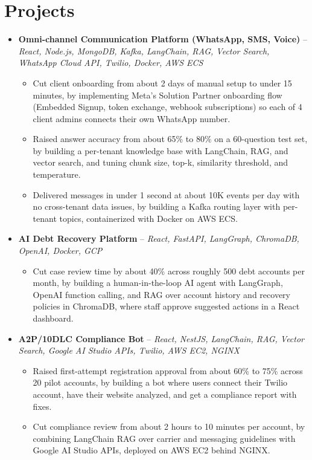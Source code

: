 \documentclass[11pt,a4paper,sans]{moderncv}
\begin{document}
\section{Projects}
\vspace{1pt}
\begin{itemize}

\item \textbf{Omni-channel Communication Platform (WhatsApp, SMS, Voice)} -- \textit{React, Node.js, MongoDB, Kafka, LangChain, RAG, Vector Search, WhatsApp Cloud API, Twilio, Docker, AWS ECS}
\begin{itemize}
    \item Cut client onboarding from about 2 days of manual setup to under 15 minutes, by implementing Meta's Solution Partner onboarding flow (Embedded Signup, token exchange, webhook subscriptions) so each of 4 client admins connects their own WhatsApp number.
    \item Raised answer accuracy from about 65\% to 80\% on a 60-question test set, by building a per-tenant knowledge base with LangChain, RAG, and vector search, and tuning chunk size, top-k, similarity threshold, and temperature.
    \item Delivered messages in under 1 second at about 10K events per day with no cross-tenant data issues, by building a Kafka routing layer with per-tenant topics, containerized with Docker on AWS ECS.
\end{itemize}

\item \textbf{AI Debt Recovery Platform} -- \textit{React, FastAPI, LangGraph, ChromaDB, OpenAI, Docker, GCP}
\begin{itemize}
    \item Cut case review time by about 40\% across roughly 500 debt accounts per month, by building a human-in-the-loop AI agent with LangGraph, OpenAI function calling, and RAG over account history and recovery policies in ChromaDB, where staff approve suggested actions in a React dashboard.
\end{itemize}

\item \textbf{A2P/10DLC Compliance Bot} -- \textit{React, NestJS, LangChain, RAG, Vector Search, Google AI Studio APIs, Twilio, AWS EC2, NGINX}
\begin{itemize}
    \item Raised first-attempt registration approval from about 60\% to 75\% across 20 pilot accounts, by building a bot where users connect their Twilio account, have their website analyzed, and get a compliance report with fixes.
    \item Cut compliance review from about 2 hours to 10 minutes per account, by combining LangChain RAG over carrier and messaging guidelines with Google AI Studio APIs, deployed on AWS EC2 behind NGINX.
\end{itemize}


\end{itemize}
\end{document}
